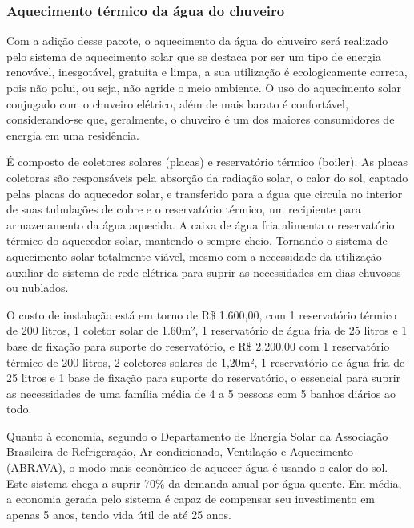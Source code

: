 \subsubsection{Aquecimento térmico da água do chuveiro}
\par Com a adição desse pacote, o aquecimento da água do chuveiro será realizado pelo sistema de aquecimento solar que se destaca por ser um tipo de energia renovável, inesgotável, gratuita e limpa, a sua utilização é ecologicamente correta, pois não polui, ou seja, não agride o meio ambiente. O uso do aquecimento solar conjugado com o chuveiro elétrico, além de mais barato é confortável, considerando-se que, geralmente, o chuveiro é um dos maiores consumidores de energia em uma residência.
\par É composto de coletores solares (placas) e reservatório térmico (boiler). As placas coletoras são responsáveis pela absorção da radiação solar, o calor do sol, captado pelas placas do aquecedor solar, e transferido para a água que circula no interior de suas tubulações de cobre e o reservatório térmico, um recipiente para armazenamento da água aquecida. A caixa de água fria alimenta o reservatório térmico do aquecedor solar, mantendo-o sempre cheio. Tornando o sistema de aquecimento solar totalmente viável, mesmo com a necessidade da utilização auxiliar do sistema de rede elétrica para suprir as necessidades em dias chuvosos ou nublados.
\par O custo de instalação está em torno de R\$ 1.600,00, com 1 reservatório térmico de 200 litros, 1 coletor solar de 1.60m², 1 reservatório de água fria de 25 litros e 1 base de fixação para suporte do reservatório, e R\$ 2.200,00 com 1 reservatório térmico de 200 litros, 2 coletores solares de 1,20m², 1 reservatório de água fria de 25 litros e 1 base de fixação para suporte do reservatório, o essencial para suprir as necessidades de uma família média de 4 a 5 pessoas com 5 banhos diários ao todo.
\par Quanto à economia, segundo o Departamento de Energia Solar da Associação Brasileira de Refrigeração, Ar-condicionado, Ventilação e Aquecimento (ABRAVA), o modo mais econômico de aquecer água é usando o calor do sol. Este sistema chega a suprir 70\% da demanda anual por água quente. Em média, a economia gerada pelo sistema é capaz de compensar seu investimento em apenas 5 anos, tendo vida útil de até 25 anos.

